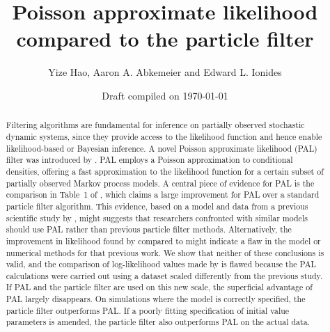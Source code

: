 \documentclass[10pt]{article}\usepackage[]{graphicx}\usepackage[]{xcolor}
\begin{document}
\title{Poisson approximate likelihood compared to the particle filter}
\author{Yize Hao, Aaron A. Abkemeier and Edward L. Ionides}
\date{Draft compiled on \today}
\maketitle

\begin{abstract}
Filtering algorithms are fundamental for inference on partially observed stochastic dynamic systems, since they provide access to the likelihood function and hence enable likelihood-based or Bayesian inference.
A novel Poisson approximate likelihood (PAL) filter was introduced by \cite{wwr}.
PAL employs a Poisson approximation to conditional densities, offering a fast approximation to the likelihood function for a certain subset of partially observed Markov process models.
A central piece of evidence for PAL is the comparison in Table~1 of \cite{wwr}, which claims a large improvement for PAL over a standard particle filter algorithm.
This evidence, based on a model and data from a previous scientific study by \citet{stocks}, might suggests that researchers confronted with similar models should use PAL rather than previous particle filter methods.
Alternatively, the improvement in likelihood found by \cite{wwr} compared to \cite{stocks} might indicate a flaw in the model or numerical methods for that previous work.
We show that neither of these conclusions is valid, and the comparison of log-likelihood values made by \cite{wwr} is flawed because the PAL calculations were carried out using a dataset scaled differently from the previous study.
If PAL and the particle filter are used on this new scale, the superficial advantage of PAL largely disappears.
On simulations where the model is correctly specified, the particle filter outperforms PAL.
If a poorly fitting specification of initial value parameters is amended, the particle filter also outperforms PAL on the actual data.
\end{abstract}
















\end{document}
